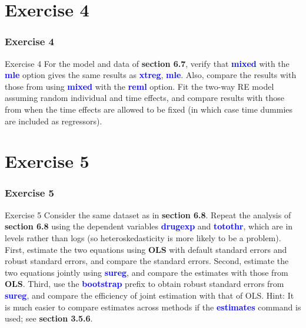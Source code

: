 \documentclass[11pt, aspectratio=169]{beamer}
\begin{document}
	\section{Exercise 4}
		\begin{frame}
			\frametitle{Exercise 4}
			\begin{block}{Exercise 4}
				For the model and data of \textcolor{red!50}{\textbf{section 6.7}}, verify that \textcolor{blue}{\textbf{mixed}} with the \textcolor{blue}{\textbf{mle}}
				option gives the same results as \textcolor{blue}{\textbf{xtreg}}, \textcolor{blue}{\textbf{mle}}. Also, compare the results
				with those from using \textcolor{blue}{\textbf{mixed}} with the \textcolor{blue}{\textbf{reml}} option. Fit the two-way RE
				model assuming random individual and time effects, and compare
				results with those from when the time effects are allowed to be fixed
				(in which case time dummies are included as regressors).
			\end{block}
		\end{frame}
	\section{Exercise 5}
		\begin{frame}
			\frametitle{Exercise 5}
			\begin{block}{Exercise 5}
				Consider the same dataset as in \textcolor{red!50}{\textbf{section 6.8}}. Repeat the analysis of
				\textcolor{red!50}{\textbf{section 6.8}} using the dependent variables \textcolor{blue}{\textbf{drugexp}} and \textcolor{blue}{\textbf{totothr}}, which
				are in levels rather than logs (so heteroskedasticity is more likely to be
				a problem). First, estimate the two equations using \textbf{OLS} with default
				standard errors and robust standard errors, and compare the standard
				errors. Second, estimate the two equations jointly using \textcolor{blue}{\textbf{sureg}}, and
				compare the estimates with those from \textbf{OLS}. Third, use the \textcolor{blue}{\textbf{bootstrap}}
				prefix to obtain robust standard errors from \textcolor{blue}{\textbf{sureg}}, and compare the
				efficiency of joint estimation with that of OLS. Hint: It is much easier to
				compare estimates across methods if the \textcolor{blue}{\textbf{estimates}} command is used;
				see \textcolor{red!50}{\textbf{section 3.5.6}}.
			\end{block}
		\end{frame}
\end{document}
